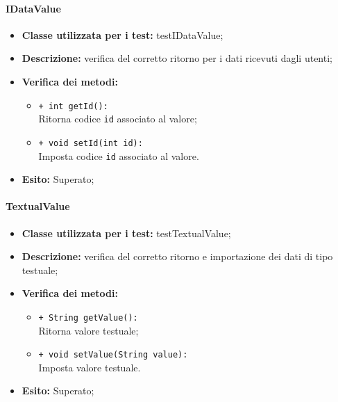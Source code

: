\paragraph{IDataValue}
\begin{flushleft}
\begin{itemize}
\item \textbf{Classe utilizzata per i test:} testIDataValue;
\item \textbf{Descrizione:} verifica del corretto ritorno per i dati ricevuti dagli utenti;
\item \textbf{Verifica dei metodi:}
\begin{sloppypar}
\begin{itemize}
\item \texttt{+ int getId():}\\ Ritorna codice \texttt{id} associato al valore;
\item \texttt{+ void setId(int id):}\\ Imposta codice \texttt{id} associato al valore.
\end{itemize}
\end{sloppypar}
\item \textbf{Esito:} Superato;
\end{itemize}
\end{flushleft}

\paragraph{TextualValue}
\begin{flushleft}
\begin{itemize}
\item \textbf{Classe utilizzata per i test:} testTextualValue;
\item \textbf{Descrizione:} verifica del corretto ritorno e importazione dei dati di tipo testuale;
\item \textbf{Verifica dei metodi:}
\begin{sloppypar}
\begin{itemize}
\item \texttt{+ String getValue():}\\ Ritorna valore testuale;
\item \texttt{+ void setValue(String value):}\\ Imposta valore testuale.
\end{itemize}
\end{sloppypar}
\item \textbf{Esito:} Superato;
\end{itemize}
\end{flushleft}

